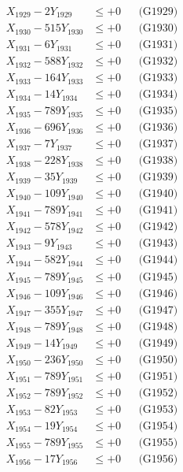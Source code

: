 \documentclass[a4paper,10pt]{article}
\begin{document}
{\begin{align}
X_{1929} - 2Y_{1929} &\leq +0 && \text{(G1929)} \\
X_{1930} - 515Y_{1930} &\leq +0 && \text{(G1930)} \\
\allowbreak
X_{1931} - 6Y_{1931} &\leq +0 && \text{(G1931)} \\
X_{1932} - 588Y_{1932} &\leq +0 && \text{(G1932)} \\
X_{1933} - 164Y_{1933} &\leq +0 && \text{(G1933)} \\
X_{1934} - 14Y_{1934} &\leq +0 && \text{(G1934)} \\
X_{1935} - 789Y_{1935} &\leq +0 && \text{(G1935)} \\
X_{1936} - 696Y_{1936} &\leq +0 && \text{(G1936)} \\
X_{1937} - 7Y_{1937} &\leq +0 && \text{(G1937)} \\
X_{1938} - 228Y_{1938} &\leq +0 && \text{(G1938)} \\
X_{1939} - 35Y_{1939} &\leq +0 && \text{(G1939)} \\
X_{1940} - 109Y_{1940} &\leq +0 && \text{(G1940)} \\
\allowbreak
X_{1941} - 789Y_{1941} &\leq +0 && \text{(G1941)} \\
X_{1942} - 578Y_{1942} &\leq +0 && \text{(G1942)} \\
X_{1943} - 9Y_{1943} &\leq +0 && \text{(G1943)} \\
X_{1944} - 582Y_{1944} &\leq +0 && \text{(G1944)} \\
X_{1945} - 789Y_{1945} &\leq +0 && \text{(G1945)} \\
X_{1946} - 109Y_{1946} &\leq +0 && \text{(G1946)} \\
X_{1947} - 355Y_{1947} &\leq +0 && \text{(G1947)} \\
X_{1948} - 789Y_{1948} &\leq +0 && \text{(G1948)} \\
X_{1949} - 14Y_{1949} &\leq +0 && \text{(G1949)} \\
X_{1950} - 236Y_{1950} &\leq +0 && \text{(G1950)} \\
\allowbreak
X_{1951} - 789Y_{1951} &\leq +0 && \text{(G1951)} \\
X_{1952} - 789Y_{1952} &\leq +0 && \text{(G1952)} \\
X_{1953} - 82Y_{1953} &\leq +0 && \text{(G1953)} \\
X_{1954} - 19Y_{1954} &\leq +0 && \text{(G1954)} \\
X_{1955} - 789Y_{1955} &\leq +0 && \text{(G1955)} \\
X_{1956} - 17Y_{1956} &\leq +0 && \text{(G1956)} \\

\end{align}}
\end{document}
